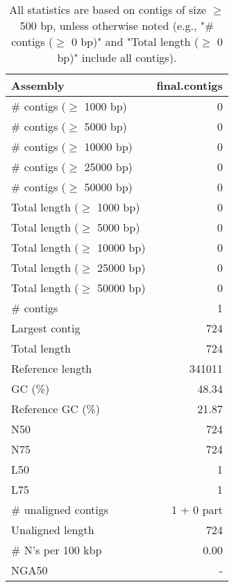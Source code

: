 \documentclass[12pt,a4paper]{article}
\begin{document}
\begin{table}[ht]
\begin{center}
\caption{All statistics are based on contigs of size $\geq$ 500 bp, unless otherwise noted (e.g., "\# contigs ($\geq$ 0 bp)" and "Total length ($\geq$ 0 bp)" include all contigs).}
\begin{tabular}{|l*{1}{|r}|}
\hline
Assembly & final.contigs \\ \hline
\# contigs ($\geq$ 1000 bp) & 0 \\ \hline
\# contigs ($\geq$ 5000 bp) & 0 \\ \hline
\# contigs ($\geq$ 10000 bp) & 0 \\ \hline
\# contigs ($\geq$ 25000 bp) & 0 \\ \hline
\# contigs ($\geq$ 50000 bp) & 0 \\ \hline
Total length ($\geq$ 1000 bp) & 0 \\ \hline
Total length ($\geq$ 5000 bp) & 0 \\ \hline
Total length ($\geq$ 10000 bp) & 0 \\ \hline
Total length ($\geq$ 25000 bp) & 0 \\ \hline
Total length ($\geq$ 50000 bp) & 0 \\ \hline
\# contigs & 1 \\ \hline
Largest contig & 724 \\ \hline
Total length & 724 \\ \hline
Reference length & 341011 \\ \hline
GC (\%) & 48.34 \\ \hline
Reference GC (\%) & 21.87 \\ \hline
N50 & 724 \\ \hline
N75 & 724 \\ \hline
L50 & 1 \\ \hline
L75 & 1 \\ \hline
\# unaligned contigs & 1 + 0 part \\ \hline
Unaligned length & 724 \\ \hline
\# N's per 100 kbp & 0.00 \\ \hline
NGA50 & - \\ \hline
\end{tabular}
\end{center}
\end{table}
\end{document}
